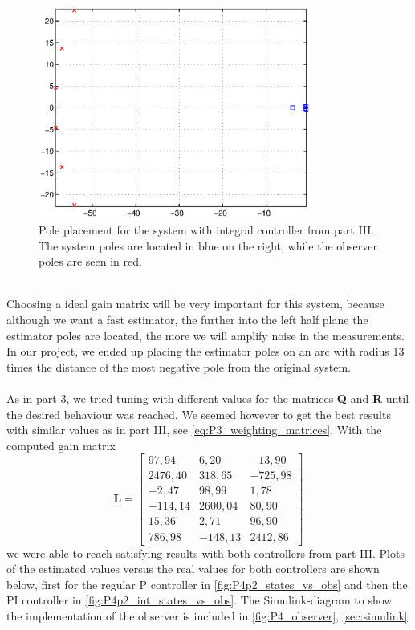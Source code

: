 \begin{figure}[htb]
	\centering
		\includegraphics[width=0.8\textwidth]{figures/Pole_placement_P4p2_integral.eps}
	\caption{Pole placement for the system with integral controller from part III. The system poles are located in blue on the right, while the observer poles are seen in red.}
\label{fig:Pole_placement_P4p2}
\end{figure}
\\

Choosing a ideal gain matrix will be very important for this system, because although we want a fast estimator, the further into the left half plane the estimator poles are located, the more we will amplify noise in the measurements. In our project, we ended up placing the estimator poles on an arc with radius 13 times the distance of the most negative pole from the original system.\\
\\As in part 3, we tried tuning with different values for the matrices \textbf{Q} and \textbf{R} until the desired behaviour was reached. We seemed however to get the best results with similar values as in part III, see \cref{eq:P3_weighting_matrices}. With the computed gain matrix
\begin{equation}\label{eq:L_P4p2}
\mathbf{L} = \begin{bmatrix}
97,94 & 6,20 & -13,90\\
2476,40 & 318,65 & -725,98\\
-2,47 & 98,99 &	1,78\\
-114,14 & 2600,04 &	80,90\\
15,36 & 2,71 & 96,90\\
786,98 & -148,13 & 2412,86
\end{bmatrix}
\end{equation}
we were able to reach satisfying results with both controllers from part III. Plots of the estimated values versus the real values for both controllers are shown below, first for the regular P controller in \cref{fig:P4p2_states_vs_obs} and then the PI controller in \cref{fig:P4p2_int_states_vs_obs}. The Simulink-diagram to show the implementation of the observer is included in \cref{fig:P4_observer}, \cref{sec:simulink}
